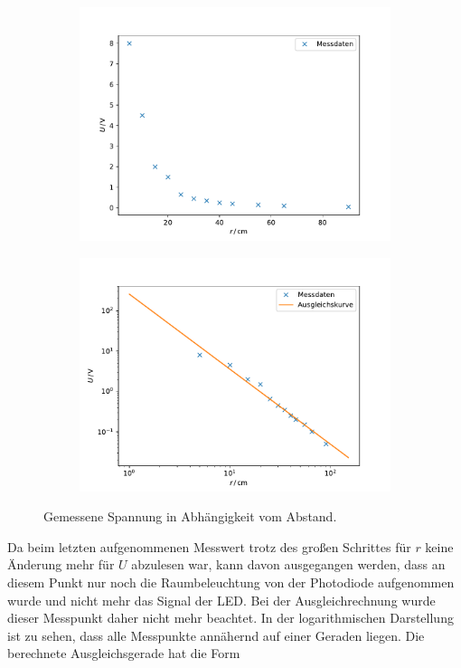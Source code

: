 \begin{figure}[h]
    \begin{subfigure}{0.45\textwidth}
        \centering
        \includegraphics[width=\textwidth]{assets/plot_3.pdf}
    \end{subfigure}
    \begin{subfigure}{0.45\textwidth}
        \centering
        \includegraphics[width=\textwidth]{assets/plot_4.pdf}
    \end{subfigure}
    \caption{Gemessene Spannung in Abhängigkeit vom Abstand.}
    \label{fig:LED}
\end{figure}
Da beim letzten aufgenommenen Messwert trotz des großen Schrittes für $r$ keine Änderung mehr für $U$ abzulesen war, kann davon ausgegangen werden, dass an diesem Punkt nur noch die Raumbeleuchtung von der Photodiode aufgenommen wurde und nicht mehr das Signal der LED. Bei der Ausgleichrechnung wurde dieser Messpunkt daher nicht mehr beachtet. In der logarithmischen Darstellung ist zu sehen, dass alle Messpunkte annähernd auf einer Geraden liegen. Die berechnete Ausgleichsgerade hat die Form
